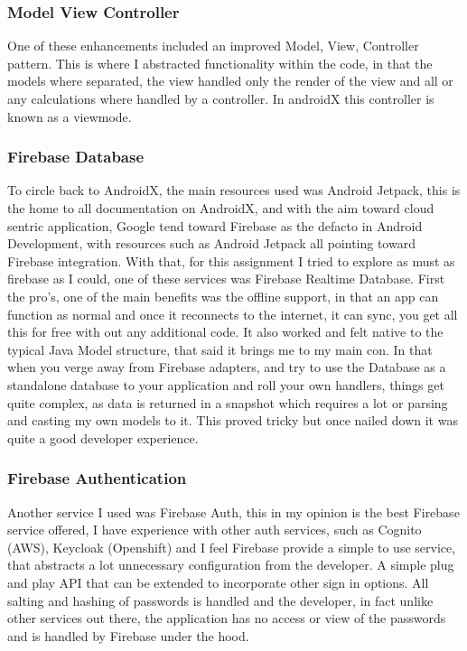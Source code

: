 \subsubsection{ Model View Controller }
One of these enhancements included an improved Model, View, Controller pattern. This is where I abstracted functionality within the code, in that the models where separated, the view handled only the render of the view and all or any calculations where handled by a controller. In androidX this controller is known as a viewmode.

\subsubsection{ Firebase Database }
To circle back to AndroidX, the main resources used was Android Jetpack, this is the home to all documentation on AndroidX, and with the aim toward cloud sentric application, Google tend toward Firebase as the defacto in Android Development, with resources such as Android Jetpack all pointing toward Firebase integration. 
With that, for this assignment I tried to explore as must as firebase as I could, one of these services was Firebase Realtime Database. First the pro's, one of the main benefits was the offline support, in that an app can function as normal and once it reconnects to the internet, it can sync, you get all this for free with out any additional code. It also worked and felt native to the typical Java Model structure, that said it brings me to my main con. In that when you verge away from Firebase adapters, and try to use the Database as a standalone database to your application and roll your own handlers, things get quite complex, as data is returned in a snapshot which requires a lot or parsing and casting my own models to it. This proved tricky but once nailed down it was quite a good developer experience.

\subsubsection{ Firebase Authentication }
Another service I used was Firebase Auth, this in my opinion is the best Firebase service offered, I have experience with other auth services, such as Cognito (AWS), Keycloak (Openshift) and I feel Firebase provide a simple to use service, that abstracts a lot unnecessary configuration from the developer. A simple plug and play API that can be extended to incorporate other sign in options. All salting and hashing of passwords is handled and the developer, in fact unlike other services out there, the application has no access or view of the passwords and is handled by Firebase under the hood.

